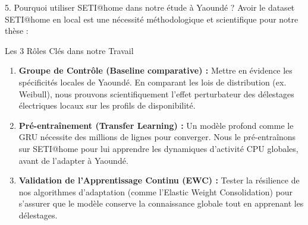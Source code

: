 \documentclass[10pt,aspectratio=169]{beamer}
\begin{document}
\begin{frame}{5. Pourquoi utiliser SETI@home dans notre étude à Yaoundé ?}
  Avoir le dataset SETI@home en local est une nécessité méthodologique et scientifique pour notre thèse :
  
  \begin{block}{Les 3 Rôles Clés dans notre Travail}
    \begin{enumerate}
      \item \textbf{Groupe de Contrôle (Baseline comparative) :} Mettre en évidence les spécificités locales de Yaoundé. En comparant les lois de distribution (ex. Weibull), nous prouvons scientifiquement l'effet perturbateur des délestages électriques locaux sur les profils de disponibilité.
      \item \textbf{Pré-entraînement (Transfer Learning) :} Un modèle profond comme le GRU nécessite des millions de lignes pour converger. Nous le pré-entraînons sur SETI@home pour lui apprendre les dynamiques d'activité CPU globales, avant de l'adapter à Yaoundé.
      \item \textbf{Validation de l'Apprentissage Continu (EWC) :} Tester la résilience de nos algorithmes d'adaptation (comme l'Elastic Weight Consolidation) pour s'assurer que le modèle conserve la connaissance globale tout en apprenant les délestages.
    \end{enumerate}
  \end{block}
\end{frame}
\end{document}
